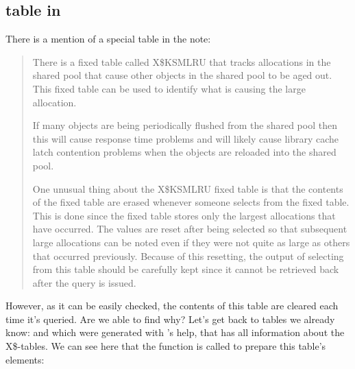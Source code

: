 \subsection{ table in \oracle}
\myindex{\oracle}

There is a mention of a special table in the  note:

\begin{framed}
\begin{quotation}
There is a fixed table called X\$KSMLRU that tracks allocations in the shared pool that cause other objects 
in the shared pool to be aged out. This fixed table can be used to identify what is causing the large allocation.

If many objects are being periodically flushed from the shared pool then this will cause response time problems 
and will likely cause library cache latch contention problems when the objects are reloaded into the shared pool.

One unusual thing about the X\$KSMLRU fixed table is that the contents of the fixed table are erased whenever 
someone selects from the fixed table. This is done since the fixed table stores only the largest allocations 
that have occurred. The values are reset after being selected so that subsequent large allocations can be noted 
even if they were not quite as large as others that occurred previously. Because of this resetting, the output 
of selecting from this table should be carefully kept since it cannot be retrieved back after the query is issued.
\end{quotation}
\end{framed}

However, as it can be easily checked, the contents of this table are cleared each time it's queried.
Are we able to find why?
Let's get back to tables we already know:  and  
which were generated with \oracletables's help, that has all information about the X\$-tables. We can see here 
that the  function is called to prepare this table's elements:

